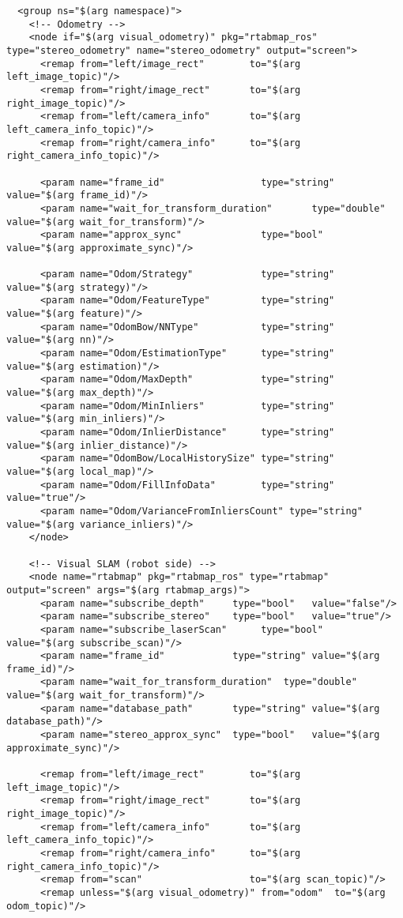 \begin{center}
\begin{footnotesize}
\begin{verbatim}
  <group ns="$(arg namespace)">
    <!-- Odometry -->
    <node if="$(arg visual_odometry)" pkg="rtabmap_ros" type="stereo_odometry" name="stereo_odometry" output="screen">
      <remap from="left/image_rect"        to="$(arg left_image_topic)"/>
      <remap from="right/image_rect"       to="$(arg right_image_topic)"/>
      <remap from="left/camera_info"       to="$(arg left_camera_info_topic)"/>
      <remap from="right/camera_info"      to="$(arg right_camera_info_topic)"/>
	  
      <param name="frame_id"                 type="string" value="$(arg frame_id)"/>
      <param name="wait_for_transform_duration"       type="double"   value="$(arg wait_for_transform)"/>
      <param name="approx_sync"              type="bool"   value="$(arg approximate_sync)"/>
	  
      <param name="Odom/Strategy"            type="string" value="$(arg strategy)"/> 
      <param name="Odom/FeatureType"         type="string" value="$(arg feature)"/>  
      <param name="OdomBow/NNType"           type="string" value="$(arg nn)"/>
      <param name="Odom/EstimationType"      type="string" value="$(arg estimation)"/> 
      <param name="Odom/MaxDepth"            type="string" value="$(arg max_depth)"/>  
      <param name="Odom/MinInliers"          type="string" value="$(arg min_inliers)"/> 
      <param name="Odom/InlierDistance"      type="string" value="$(arg inlier_distance)"/>       
      <param name="OdomBow/LocalHistorySize" type="string" value="$(arg local_map)"/> 
      <param name="Odom/FillInfoData"        type="string" value="true"/>   
      <param name="Odom/VarianceFromInliersCount" type="string" value="$(arg variance_inliers)"/>
    </node>
  
    <!-- Visual SLAM (robot side) -->
    <node name="rtabmap" pkg="rtabmap_ros" type="rtabmap" output="screen" args="$(arg rtabmap_args)">
      <param name="subscribe_depth"     type="bool"   value="false"/>
      <param name="subscribe_stereo"    type="bool"   value="true"/>
      <param name="subscribe_laserScan"      type="bool"   value="$(arg subscribe_scan)"/>
      <param name="frame_id"            type="string" value="$(arg frame_id)"/>
      <param name="wait_for_transform_duration"  type="double"   value="$(arg wait_for_transform)"/>
      <param name="database_path"       type="string" value="$(arg database_path)"/>
      <param name="stereo_approx_sync"  type="bool"   value="$(arg approximate_sync)"/>
	
      <remap from="left/image_rect"        to="$(arg left_image_topic)"/>
      <remap from="right/image_rect"       to="$(arg right_image_topic)"/>
      <remap from="left/camera_info"       to="$(arg left_camera_info_topic)"/>
      <remap from="right/camera_info"      to="$(arg right_camera_info_topic)"/>
      <remap from="scan"                   to="$(arg scan_topic)"/>
      <remap unless="$(arg visual_odometry)" from="odom"  to="$(arg odom_topic)"/>
      

\end{verbatim}
\end{footnotesize}
\end{center}
